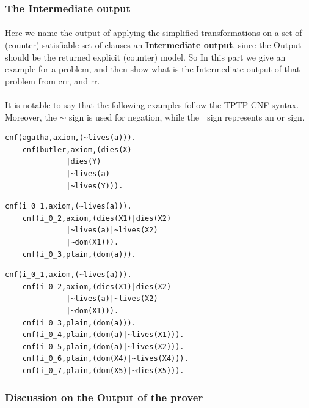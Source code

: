 	\subsubsection{The Intermediate output}
		\paragraph{}
		Here we name the output of applying the simplified transformations on a set of (counter) satisfiable set of clauses an \textbf{Intermediate output}, since the Output should be the returned explicit (counter) model. So In this part we give an example for a problem, and then show what is the Intermediate output of that problem from \ac{crr}, and \ac{rr}. 		
		
		
		\paragraph{}
		It is notable to say that the following examples follow the TPTP CNF syntax. Moreover, the $\sim$ sign is used for negation, while the $\mid$ sign represents an or sign.
			
			\begin{minipage}{\textwidth}
			\begin{lstlisting}[caption=Satisfiable CNF problem Example,frame=single]
	cnf(agatha,axiom,(~lives(a))).
	cnf(butler,axiom,(dies(X)
			  |dies(Y)
			  |~lives(a)
			  |~lives(Y))).		
			\end{lstlisting}		
			
			\begin{lstlisting}[caption=CRR output Example,frame=single]
	cnf(i_0_1,axiom,(~lives(a))).
	cnf(i_0_2,axiom,(dies(X1)|dies(X2)
			  |~lives(a)|~lives(X2)
			  |~dom(X1))).
	cnf(i_0_3,plain,(dom(a))).
			\end{lstlisting}		

			\begin{lstlisting}[caption=RR output Example,frame=single]
	cnf(i_0_1,axiom,(~lives(a))).
	cnf(i_0_2,axiom,(dies(X1)|dies(X2)
			  |~lives(a)|~lives(X2)
			  |~dom(X1))).
	cnf(i_0_3,plain,(dom(a))).
	cnf(i_0_4,plain,(dom(a)|~lives(X1))).
	cnf(i_0_5,plain,(dom(a)|~lives(X2))).
	cnf(i_0_6,plain,(dom(X4)|~lives(X4))).
	cnf(i_0_7,plain,(dom(X5)|~dies(X5))).
			\end{lstlisting}		
			\end{minipage}
		

	\subsubsection{Discussion on the Output of the prover}
